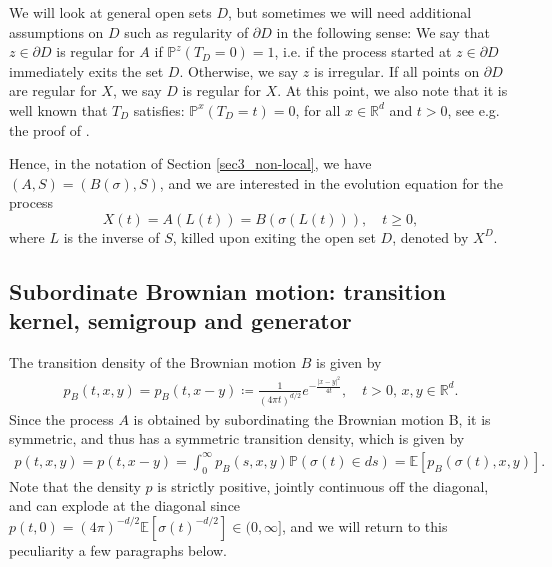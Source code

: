 \documentclass[reqno]{amsart}
\theoremstyle{remark}
\numberwithin{equation}{section} %
\newcommand{\1}{\mathds{1}}
\begin{document}
	We will look at general open sets $D$, but sometimes we will need additional assumptions on $D$ such as regularity of $\partial D$ in the following sense: We say that $z\in \partial D$ is regular for $A$ if $\mathds{P}^z(T_D=0)=1$, i.e. if the process started at $z\in \partial D$ immediately exits the set $D$. Otherwise, we say $z$ is irregular. If all points on $\partial D$ are regular for $X$, we say $D$ is regular for $X$. At this point, we also note that it is well known that $T_D$ satisfies: $\mathds{P}^x(T_D=t)=0$, for all $x\in \mathbb{R}^d$ and $t>0$, see e.g. the proof of \cite[Proposition 1.20]{chung_zhao}.
	
	Hence, in the notation of Section \ref{sec3_non-local}, we have $(A,S)=(B(\sigma),S)$, and we are interested in the evolution equation for the process $$X(t) = A(L(t)) = B(\sigma(L(t))), \quad t \geq 0,$$
	where $L$ is the inverse of $S$, killed upon exiting the open set $D$, denoted by $X^D$.
	
	\subsection{Subordinate Brownian motion: transition kernel, semigroup and generator}
	The transition density of the Brownian motion $B$ is given by
	\begin{align}\label{eq:trans density BM}
		p_B(t,x,y)=p_B(t,x-y)\coloneqq \frac{1}{(4\pi t)^{d/2}}e^{-\frac{|x-y|^2}{4t}}, \quad t>0,\, x,y\in\mathbb{R}^d.
	\end{align}
	Since the process $A$ is obtained by subordinating the Brownian motion B, it is symmetric, and thus has a symmetric transition density, which is given by
	\begin{align}\label{eq:trans density SBM}
		p(t,x,y)=p(t,x-y)=\int_0^\infty p_B(s,x,y)\mathds{P}(\sigma(t)\in ds)=\mathds{E}[p_B(\sigma(t),x,y)].
	\end{align}
	Note that the density $p$ is strictly positive, jointly continuous off the diagonal, and can explode at the diagonal since $p(t,0)=(4\pi)^{-d/2}\mathds{E}[\sigma(t)^{-d/2}]\in(0,\infty]$, and we will return to this peculiarity a few paragraphs below.
	
\end{document}
